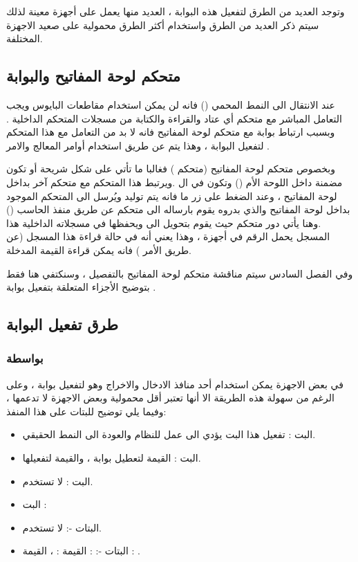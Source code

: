 \documentclass[document.tex]{subfiles}
\begin{document}
وتوجد العديد من الطرق لتفعيل هذه البوابة ، العديد منها يعمل على أجهزة معينة لذلك سيتم ذكر العديد من الطرق واستخدام أكثر الطرق محمولية على صعيد الاجهزة المختلفة.

\subsection{متحكم لوحة المفاتيح  والبوابة }
عند الانتقال الى النمط المحمي () فانه لن يمكن استخدام مقاطعات البايوس ويجب التعامل المباشر مع متحكم أي عتاد والقراءة والكتابة من مسجلات المتحكم الداخلية . وبسبب ارتباط بوابة  مع متحكم لوحة المفاتيح فانه لا بد من التعامل مع هذا المتحكم لتفعيل البوابة ، وهذا يتم عن طريق استخدام أوامر المعالج  والامر .

وبخصوص متحكم لوحة المفاتيح (متحكم ) فغالبا ما تأتي على شكل شريحة  أو تكون مضمنة داخل اللوحة الأم () وتكون في ال .ويرتبط هذا المتحكم مع متحكم آخر بداخل لوحة المفاتيح ، وعند الضغط على زر ما فانه يتم توليد  ويُرسل الى المتحكم الموجود بداخل لوحة المفاتيح والذي بدروه يقوم بارساله الى متحكم  عن طريق منفذ الحاسب () .وهنا يأتي دور متحكم  حيث يقوم بتحويل  الى  ويحفظها في مسجلاته الداخلية  هذا المسجل يحمل الرقم  في أجهزة ، وهذا يعني أنه في حالة قراءة هذا المسجل (عن طريق الأمر ) فانه يمكن قراءة القيمة المدخلة.

وفي الفصل السادس سيتم مناقشة متحكم لوحة المفاتيح بالتفصيل ، وسنكتفي هنا فقط بتوضيح الأجزاء المتعلقة بتفعيل بوابة .



\subsection{طرق تفعيل البوابة }

\subsubsection{بواسطة }

في بعض الاجهزة يمكن استخدام أحد منافذ الادخال والاخراج وهو  لتفعيل بوابة  ، وعلى الرغم من سهولة هذه الطريقة الا أنها تعتبر أقل محمولية وبعض الاجهزة لا تدعمها ، وفيما يلي توضيح للبتات على هذا المنفذ:

\begin{itemize}
\item البت : تفعيل هذا البت يؤدي الى عمل  للنظام والعودة الى النمط الحقيقي.
\item البت : القيمة  لتعطيل بوابة  ، والقيمة  لتفعيلها.
\item البت : لا تستخدم.
\item البت : 
\item البتات -: لا تستخدم.
\item البتات -:  : القيمة : ، القيمة : .
\end{itemize} 
\end{document}
